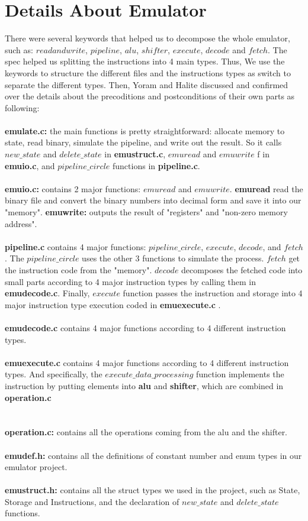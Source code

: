 \documentclass[a4paper]{article}
\begin{document}
\section{Details About Emulator}
There were several keywords that helped us to decompose the whole emulator, such as: $read and write$, $pipeline$, $alu$, $shifter$, $execute$, $decode$ and $fetch$. The spec helped us splitting the instructions into 4 main types. Thus, We use the keywords to structure the different files and the instructions types as switch to separate the different types. Then, Yoram and Halite discussed and confirmed over the details about the precoditions and postconditions of their own parts as following:
\\\\
\textbf{emulate.c:} the main functions is pretty straightforward: allocate memory to state, read binary, simulate the pipeline, and write out the result. So it calls $new\_state$ and $delete\_state$ in \textbf{emustruct.c}, $emuread$ and $emuwrite$ f in \textbf{emuio.c}, and $pipeline\_circle$ functions in \textbf{pipeline.c}.
\\\\
\textbf{emuio.c:} contains 2 major functions: $emuread$ and $emuwrite$. \textbf{emuread} read the binary file and convert the binary numbers into decimal form and save it into our "memory".
\textbf{emuwrite:} outputs the result of "registers" and "non-zero memory address".
\\\\
\textbf{pipeline.c} contains 4 major functions: $pipeline\_circle$, $execute$, $decode$, and $fetch$. The $pipeline\_circle$ uses the other 3 functions to simulate the process. $fetch$ get the instruction code from the "memory". $decode$ decomposes the fetched code into small parts according to 4 major instruction types by calling them in \textbf{emudecode.c}. Finally, $execute$ function passes the instruction and storage into 4 major instruction type execution coded in \textbf{emuexecute.c} .
\\\\
\textbf{emudecode.c} contains 4 major functions according to 4 different instruction types.
\\\\
\textbf{emuexecute.c} contains 4 major functions according to 4 different instruction types. And specifically, the $execute\_data\_processing$ function implements the instruction by putting elements into \textbf{alu} and \textbf{shifter}, which are combined in \textbf{operation.c}\\
\\\\
\textbf{operation.c:} contains all the operations coming from the alu and the shifter.
\\\\
\textbf{emudef.h:} contains all the definitions of constant number and enum types in our emulator project.
\\\\
\textbf{emustruct.h:} contains all the struct types we used in the project, such as State, Storage and Instructions, and the declaration of $new\_state$ and $delete\_state$ functions.
\end{document}
